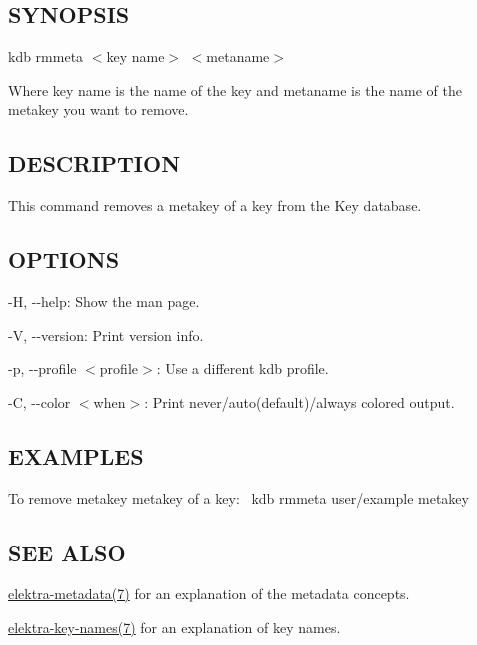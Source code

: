 \subsection*{S\+Y\+N\+O\+P\+S\+IS}

{\ttfamily kdb rmmeta $<$key name$>$ $<$metaname$>$}

Where {\ttfamily key name} is the name of the key and {\ttfamily metaname} is the name of the metakey you want to remove.

\subsection*{D\+E\+S\+C\+R\+I\+P\+T\+I\+ON}

This command removes a metakey of a key from the Key database.

\subsection*{O\+P\+T\+I\+O\+NS}


\begin{DoxyItemize}
\item {\ttfamily -\/H}, {\ttfamily -\/-\/help}\+: Show the man page.
\item {\ttfamily -\/V}, {\ttfamily -\/-\/version}\+: Print version info.
\item {\ttfamily -\/p}, {\ttfamily -\/-\/profile $<$profile$>$}\+: Use a different kdb profile.
\item {\ttfamily -\/C}, {\ttfamily -\/-\/color $<$when$>$}\+: Print never/auto(default)/always colored output.
\end{DoxyItemize}

\subsection*{E\+X\+A\+M\+P\+L\+ES}

To remove metakey {\ttfamily metakey} of a key\+:~\newline
 {\ttfamily kdb rmmeta user/example metakey}

\subsection*{S\+EE A\+L\+SO}


\begin{DoxyItemize}
\item \hyperlink{doc_help_elektra-metadata_md}{elektra-\/metadata(7)} for an explanation of the metadata concepts.
\item \hyperlink{doc_help_elektra-key-names_md}{elektra-\/key-\/names(7)} for an explanation of key names. 
\end{DoxyItemize}